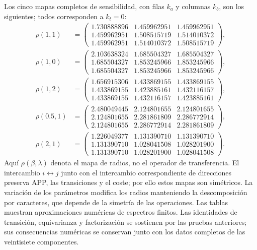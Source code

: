 Los cinco mapas completos de sensibilidad, con filas $k_a$ y columnas
$k_b$, son los siguientes; todos corresponden a $k_t=0$:
\begin{align*}
\rho(1,1)&=\begin{pmatrix}
1.730888896&1.459962951&1.459962951\\
1.459962951&1.508515719&1.514010372\\
1.459962951&1.514010372&1.508515719
\end{pmatrix},\\
\rho(1,0)&=\begin{pmatrix}
2.103638324&1.685504327&1.685504327\\
1.685504327&1.853245966&1.853245966\\
1.685504327&1.853245966&1.853245966
\end{pmatrix},\\
\rho(1,2)&=\begin{pmatrix}
1.656915306&1.433869155&1.433869155\\
1.433869155&1.423885161&1.432116157\\
1.433869155&1.432116157&1.423885161
\end{pmatrix},\\
\rho(0.5,1)&=\begin{pmatrix}
2.480049445&2.124801655&2.124801655\\
2.124801655&2.281861809&2.286772914\\
2.124801655&2.286772914&2.281861809
\end{pmatrix},\\
\rho(2,1)&=\begin{pmatrix}
1.226049377&1.131390710&1.131390710\\
1.131390710&1.028041508&1.028201900\\
1.131390710&1.028201900&1.028041508
\end{pmatrix}.
\end{align*}
Aquí $\rho(\beta,\lambda)$ denota el mapa de radios, no el operador de
transferencia. El intercambio $i\leftrightarrow j$ junto con el intercambio
correspondiente de direcciones preserva APP, las transiciones y el coste;
por ello estos mapas son simétricos. La variación de los parámetros modifica los radios manteniendo
la descomposición por caracteres, que depende de la simetría de las
operaciones. Las tablas muestran aproximaciones numéricas de espectros
finitos. Las identidades de transición, equivarianza y factorización se
sostienen por las pruebas anteriores; sus consecuencias numéricas se
conservan junto con los datos completos de las veintisiete componentes.

